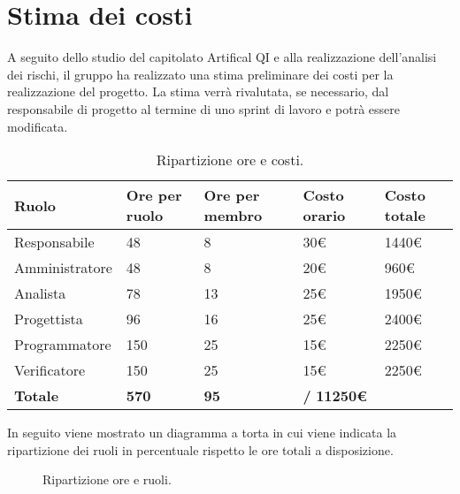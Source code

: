 \section{Stima dei costi}

\label{sec:stima_costi}
A seguito dello studio del capitolato Artifical QI e alla realizzazione dell'analisi dei rischi, 
il gruppo ha realizzato una stima preliminare dei costi per la realizzazione del progetto.
La stima verrà rivalutata, se necessario, dal responsabile di progetto al termine di uno sprint di lavoro e potrà essere modificata.

\begin{table}[!h]
    \centering
    \begin{tabularx}{\textwidth}{| X | X | X | X | X |}
        \hline
            \textbf{Ruolo} &  
            \textbf{Ore per ruolo} & 
            \textbf{Ore per membro} &
            \textbf{Costo orario} &
            \textbf{Costo totale} \\
        \hline
        \hline
            Responsabile & 48 & 8 & 30€ & 1440€ \\
        \hline
            Amministratore & 48 & 8 & 20€ & 960€ \\
        \hline 
            Analista & 78 & 13 & 25€ & 1950€ \\
        \hline 
            Progettista & 96 & 16 & 25€ & 2400€ \\
        \hline 
            Programmatore & 150 & 25 & 15€ & 2250€ \\
        \hline 
            Verificatore & 150 & 25 & 15€ & 2250€ \\
        \hline 
        \textbf{Totale} & \textbf{570} & \textbf{95} & \textbf{/} \textbf{11250€} \\ 
        \hline  
    \end{tabularx}
    \caption{Ripartizione ore e costi.}
    \label{tab:stima_costi} 
\end{table}

In seguito viene mostrato un diagramma a torta in cui viene indicata la ripartizione dei ruoli in percentuale rispetto le ore totali a disposizione.

\begin{figure}[!h]
    \centering
    \caption{Ripartizione ore e ruoli.}
    \label{fig:pie}
\end{figure}